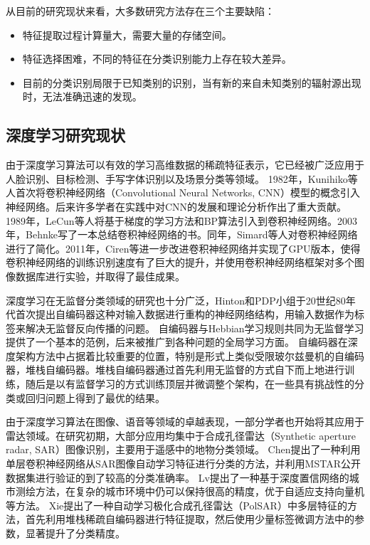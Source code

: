 从目前的研究现状来看，大多数研究方法存在三个主要缺陷：
\begin{itemize}
	\item 特征提取过程计算量大，需要大量的存储空间。
	\item 特征选择困难，不同的特征在分类识别能力上存在较大差异。
	\item 目前的分类识别局限于已知类别的识别，当有新的来自未知类别的辐射源出现时，无法准确迅速的发现。
\end{itemize}

\subsection{深度学习研究现状}
由于深度学习算法可以有效的学习高维数据的稀疏特征表示，它已经被广泛应用于人脸识别、目标检测、手写字体识别以及场景分类等领域。
1982年，Kunihiko等人首次将卷积神经网络（Convolutional Neural Networks, CNN）模型的概念引入神经网络。后来许多学者在实践中对CNN的发展和理论分析作出了重大贡献。1989年，LeCun等人将基于梯度的学习方法和BP算法引入到卷积神经网络。2003年，Behnke写了一本总结卷积神经网络的书。同年，Simard等人对卷积神经网络进行了简化。2011年，Ciren等进一步改进卷积神经网络并实现了GPU版本，使得卷积神经网络的训练识别速度有了巨大的提升，并使用卷积神经网络框架对多个图像数据库进行实验，并取得了最佳成果。

深度学习在无监督分类领域的研究也十分广泛，Hinton和PDP小组于20世纪80年代首次提出自编码器这种对输入数据进行重构的神经网络结构，用输入数据作为标签来解决无监督反向传播的问题。
自编码器与Hebbian学习规则共同为无监督学习提供了一个基本的范例，后来被推广到各种问题的全局学习方面。
自编码器在深度架构方法中占据着比较重要的位置，特别是形式上类似受限玻尔兹曼机的自编码器，堆栈自编码器。堆栈自编码器通过首先利用无监督的方式自下而上地进行训练，随后是以有监督学习的方式训练顶层并微调整个架构，在一些具有挑战性的分类或回归问题上得到了最优的结果。

由于深度学习算法在图像、语音等领域的卓越表现，一部分学者也开始将其应用于雷达领域。在研究初期，大部分应用均集中于合成孔径雷达（Synthetic aperture radar, SAR）图像识别，主要用于遥感中的地物分类领域。
Chen提出了一种利用单层卷积神经网络从SAR图像自动学习特征进行分类的方法，并利用MSTAR公开数据集进行验证的到了较高的分类准确率。
Lv提出了一种基于深度置信网络的城市测绘方法，在复杂的城市环境中仍可以保持很高的精度，优于自适应支持向量机等方法。
Xie提出了一种自动学习极化合成孔径雷达（PolSAR）中多层特征的方法，首先利用堆栈稀疏自编码器进行特征提取，然后使用少量标签微调方法中的参数，显著提升了分类精度。


